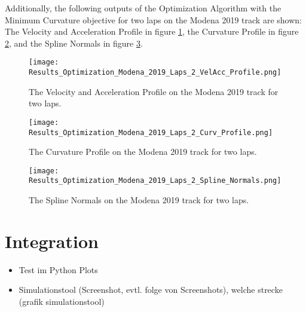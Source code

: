 Additionally, the following outputs of the Optimization Algorithm with the Minimum Curvature objective for two laps on the Modena 2019 track are shown: The Velocity and Acceleration Profile in figure \ref{fig:Results Modena 2019 Laps 2 VelAcc Profile}, the Curvature Profile in figure \ref{fig:Results Modena 2019 Laps 2 Curv Profile}, and the Spline Normals in figure \ref{fig:Results Modena 2019 Laps 2 Spline Normals}.
\begin{figure}[H]
    \centering
    \texttt{[image: Results\_Optimization\_Modena\_2019\_Laps\_2\_VelAcc\_Profile.png]}
    \caption{The Velocity and Acceleration Profile on the Modena 2019 track for two laps.}
    \label{fig:Results Modena 2019 Laps 2 VelAcc Profile}
\end{figure}
\begin{figure}[H]
    \centering
    \texttt{[image: Results\_Optimization\_Modena\_2019\_Laps\_2\_Curv\_Profile.png]}
    \caption{The Curvature Profile on the Modena 2019 track for two laps.}
    \label{fig:Results Modena 2019 Laps 2 Curv Profile}
\end{figure}
\begin{figure}[H]
    \centering
    \texttt{[image: Results\_Optimization\_Modena\_2019\_Laps\_2\_Spline\_Normals.png]}
    \caption{The Spline Normals on the Modena 2019 track for two laps.}
    \label{fig:Results Modena 2019 Laps 2 Spline Normals}
\end{figure}

\section{Integration} 
\begin{itemize}
    \item Test im Python Plots
    \item Simulationstool (Screenshot, evtl. folge von Screenshots), welche strecke (grafik simulationstool)
\end{itemize}

